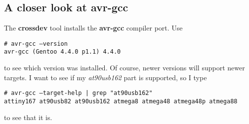 \subsection{A closer look at \textbf{avr-gcc}}
\label{gcc_subsection}
The \textbf{crossdev} tool installs the \textbf{avr-gcc} compiler
port.  Use
\begin{center}
    \vspace{-\baselineskip}
    \begin{boxedminipage}[t]{\textwidth}
        \texttt{\# avr-gcc --version}\\
        \texttt{avr-gcc (Gentoo 4.4.0 p1.1) 4.4.0}
    \end{boxedminipage}
\end{center}
to see which version was installed.  Of course, newer versions will
support newer targets.  I want to see if my \textsl{at90usb162} part
is supported, so I type
\begin{center}
    \vspace{-\baselineskip}
    \begin{boxedminipage}[t]{\textwidth}
        \texttt{\# avr-gcc --target-help | grep "at90usb162"}\\
        \texttt{attiny167 at90usb82 at90usb162 atmega8
                atmega48 atmega48p atmega88}
    \end{boxedminipage}
\end{center}
to see that it is.

\clearpage
